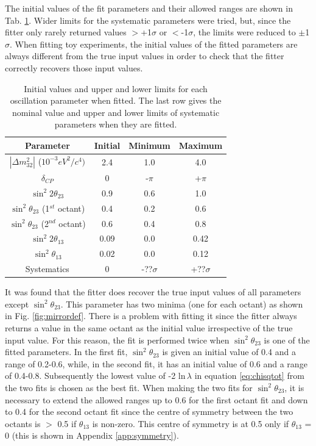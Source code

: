The initial values of the fit parameters and their allowed ranges are shown in Tab. \ref{tab:initvalues}. Wider limits for the systematic 
parameters were tried, but, since the fitter only rarely returned values $>$+1$\sigma$ or $<$-1$\sigma$, the limits were reduced to 
$\pm$1$\sigma$. When fitting toy experiments, the initial values of the fitted parameters are always different from the true input values 
in order to check that the fitter correctly recovers those input values.  
\begin{table}[h]
\centering
\begin{tabular}{|c|c|c|c|}
\hline
Parameter & Initial & Minimum & Maximum \\
\hline 
\hline
$|\Delta m_{32}^{2}|$ ($10^{-3} eV^{2}/c^{4})$ & 2.4  & 1.0 & 4.0\\
\hline
$\delta_{CP}$ & 0 &  -$\pi$ & +$\pi$ \\
\hline
$\sin^{2}2\theta_{23} $ & 0.9 & 0.6 & 1.0 \\
$\sin^{2}\theta_{23} $ (1$^{st}$ octant) & 0.4 & 0.2 & 0.6 \\
$\sin^{2}\theta_{23} $ (2$^{nd}$ octant) & 0.6 & 0.4 & 0.8 \\
\hline
$\sin^{2}2\theta_{13} $ & 0.09 & 0.0 & 0.42 \\
$\sin^{2}\theta_{13}   $ & 0.02 & 0.0 & 0.12 \\
\hline
Systematics & 0 & -??$\sigma$ &  +??$\sigma$ \\
\hline
\end{tabular}
\caption{Initial values and upper and lower limits for each oscillation parameter when fitted. The last row gives the nominal value 
         and upper and lower limits of systematic parameters when they are fitted.}
\label{tab:initvalues}
\end{table}
It was found that the fitter does recover the true input values of all parameters except $\sin^{2}\theta_{23}$. This parameter has two minima 
(one for each octant) as shown in Fig. \ref{fig:mirrordef}. There is a problem with fitting it since the fitter always returns a value in the 
same octant as the initial value irrespective of the true input value. For this reason, the fit is performed twice when $\sin^{2}\theta_{23}$ 
is one of the fitted parameters. In the first fit, $\sin^{2}\theta_{23}$ is given an initial value of 0.4 and a range of 0.2-0.6, while, in the 
second fit, it has an initial value of 0.6 and a range of 0.4-0.8. Subsequently the lowest value of -2 ln$\, \lambda$ in equation \ref{eq:chisqtot} 
from the two fits is chosen as the best fit. When making the two fits for $\sin^{2}\theta_{23}$, it is necessary to extend the allowed ranges 
up to 0.6 for the first octant fit and down to 0.4 for the second octant fit since the centre of symmetry between the two octants is $>$ 0.5 if 
$\theta_{13}$ is non-zero. This centre of symmetry is at 0.5 only if $\theta_{13}$ = 0 (this is shown in Appendix \ref{app:symmetry}).  

